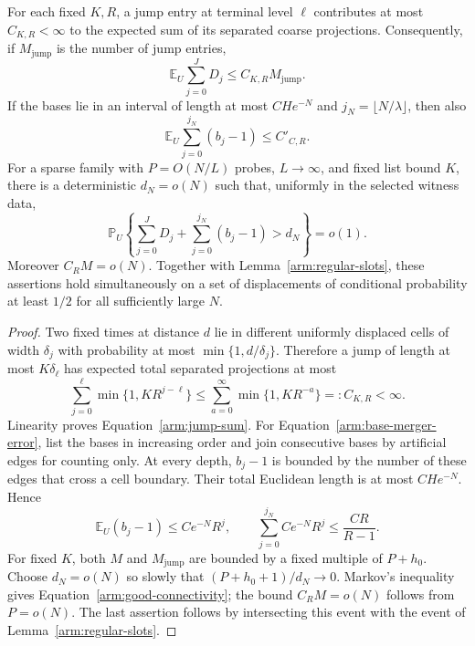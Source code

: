 \begin{lemma}\label{arm:jump-errors}
For each fixed $K,R$, a jump entry at terminal level $\ell$ contributes
at most $C_{K,R}<\infty$ to the expected sum of its separated coarse
projections.  Consequently, if $M_{\mathrm{jump}}$ is the number of jump
entries,
\begin{equation}\label{arm:jump-sum}
 \mathbb E_U\sum_{j=0}^JD_j
 \leq C_{K,R}M_{\mathrm{jump}}.
\end{equation}
If the bases lie in an interval of length at most $C H e^{-N}$ and
$j_N=\lfloor N/\lambda\rfloor$, then also
\begin{equation}\label{arm:base-merger-error}
 \mathbb E_U\sum_{j=0}^{j_N}(b_j-1)\leq C'_{C,R}.
\end{equation}
For a sparse family with $P=O(N/L)$ probes, $L\longrightarrow\infty$,
and fixed list bound $K$, there is a deterministic $d_N=o(N)$ such that,
uniformly in the selected witness data,
\begin{equation}\label{arm:good-connectivity}
 \mathbb P_U\left\{
 \sum_{j=0}^JD_j+
 \sum_{j=0}^{j_N}(b_j-1)>d_N\right\}=o(1).
\end{equation}
Moreover $C_RM=o(N)$.  Together with
Lemma~\ref{arm:regular-slots}, these assertions hold simultaneously on
a set of displacements of conditional probability at least $1/2$ for
all sufficiently large $N$.
\end{lemma}
\begin{proof}
Two fixed times at distance $d$ lie in different uniformly displaced
cells of width $\delta_j$ with probability at most
$\min\{1,d/\delta_j\}$.  Therefore a jump of length at most
$K\delta_\ell$ has expected total separated projections at most
\[
 \sum_{j=0}^\ell\min\{1,K R^{j-\ell}\}
 \leq \sum_{a=0}^\infty\min\{1,K R^{-a}\}
 =:C_{K,R}<\infty.
\]
Linearity proves Equation~\eqref{arm:jump-sum}.  For
Equation~\eqref{arm:base-merger-error}, list the bases in increasing
order and join consecutive bases by artificial edges for counting only.
At every depth, $b_j-1$ is bounded by the number of these edges that
cross a cell boundary.  Their total Euclidean length is at most
$CHe^{-N}$.  Hence
\[
 \mathbb E_U(b_j-1)\leq C e^{-N}R^j,
 \qquad
 \sum_{j=0}^{j_N}C e^{-N}R^j\leq \frac{CR}{R-1}.
\]
For fixed $K$, both $M$ and $M_{\mathrm{jump}}$ are bounded by a fixed
multiple of $P+h_0$.  Choose $d_N=o(N)$ so slowly that
$(P+h_0+1)/d_N\longrightarrow0$.  Markov's inequality gives
Equation~\eqref{arm:good-connectivity}; the bound $C_RM=o(N)$ follows
from $P=o(N)$.  The last assertion follows by intersecting this event
with the event of Lemma~\ref{arm:regular-slots}.
\end{proof}

